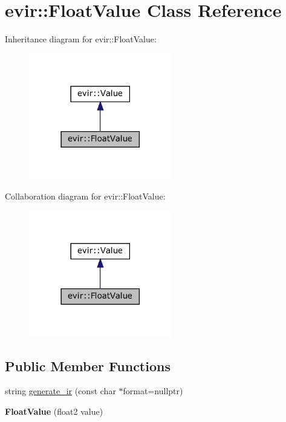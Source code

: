 \hypertarget{classevir_1_1FloatValue}{}\section{evir\+:\+:Float\+Value Class Reference}
\label{classevir_1_1FloatValue}


Inheritance diagram for evir\+:\+:Float\+Value\+:
\nopagebreak
\begin{figure}[H]
\begin{center}
\leavevmode
\includegraphics[width=177pt]{classevir_1_1FloatValue__inherit__graph}
\end{center}
\end{figure}


Collaboration diagram for evir\+:\+:Float\+Value\+:
\nopagebreak
\begin{figure}[H]
\begin{center}
\leavevmode
\includegraphics[width=177pt]{classevir_1_1FloatValue__coll__graph}
\end{center}
\end{figure}
\subsection*{Public Member Functions}
\begin{DoxyCompactItemize}
\item 
string \hyperlink{classevir_1_1FloatValue_a775e25d41c34aca73ed9418963bb652b}{generate\+\_\+ir} (const char $\ast$format=nullptr)
\item 
\mbox{\label{classevir_1_1FloatValue_a99da4695fa2baf5e8b397e03dc2fca4a}} 
{\bfseries Float\+Value} (float2 value)
\end{DoxyCompactItemize}

